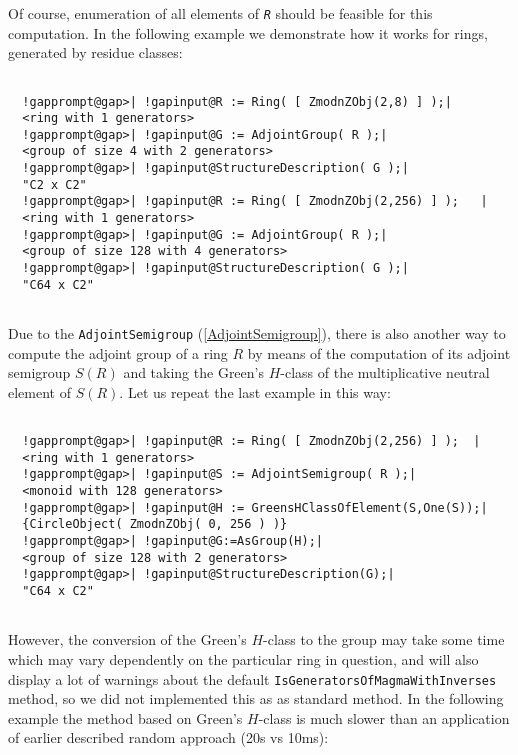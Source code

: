 \documentclass[a4paper,11pt]{report}
\begin{document}
{{{ Of course, enumeration of all elements of \mbox{\texttt{\mdseries\slshape R}} should be feasible for this computation. In the following example we
demonstrate how it works for rings, generated by residue classes: 
\begin{Verbatim}[commandchars=!@|,fontsize=\small,frame=single,label=Example]
  
  !gapprompt@gap>| !gapinput@R := Ring( [ ZmodnZObj(2,8) ] );|
  <ring with 1 generators>
  !gapprompt@gap>| !gapinput@G := AdjointGroup( R );|
  <group of size 4 with 2 generators>
  !gapprompt@gap>| !gapinput@StructureDescription( G );|
  "C2 x C2"
  !gapprompt@gap>| !gapinput@R := Ring( [ ZmodnZObj(2,256) ] );   |
  <ring with 1 generators>
  !gapprompt@gap>| !gapinput@G := AdjointGroup( R );|
  <group of size 128 with 4 generators>
  !gapprompt@gap>| !gapinput@StructureDescription( G );|
  "C64 x C2"
  
\end{Verbatim}
 Due to the \texttt{AdjointSemigroup} (\ref{AdjointSemigroup}), there is also another way to compute the adjoint group of a ring $R$ by means of the computation of its adjoint semigroup $S(R)$ and taking the Green's $H$-class of the multiplicative neutral element of $S(R)$. Let us repeat the last example in this way: 
\begin{Verbatim}[commandchars=!@|,fontsize=\small,frame=single,label=Example]
  
  !gapprompt@gap>| !gapinput@R := Ring( [ ZmodnZObj(2,256) ] );  |
  <ring with 1 generators>
  !gapprompt@gap>| !gapinput@S := AdjointSemigroup( R );|
  <monoid with 128 generators>
  !gapprompt@gap>| !gapinput@H := GreensHClassOfElement(S,One(S));|
  {CircleObject( ZmodnZObj( 0, 256 ) )}
  !gapprompt@gap>| !gapinput@G:=AsGroup(H);|
  <group of size 128 with 2 generators>
  !gapprompt@gap>| !gapinput@StructureDescription(G);|
  "C64 x C2"
  
\end{Verbatim}
 However, the conversion of the Green's $H$-class to the group may take some time which may vary dependently on the
particular ring in question, and will also display a lot of warnings about the
default \texttt{IsGeneratorsOfMagmaWithInverses} method, so we did not implemented this as as standard method. In the following
example the method based on Green's $H$-class is much slower than an application of earlier described random approach
(20s vs 10ms): 
\begin{Verbatim}[commandchars=!@|,fontsize=\small,frame=single,label=Example]
  

\end{Verbatim}}}}
\end{document}
